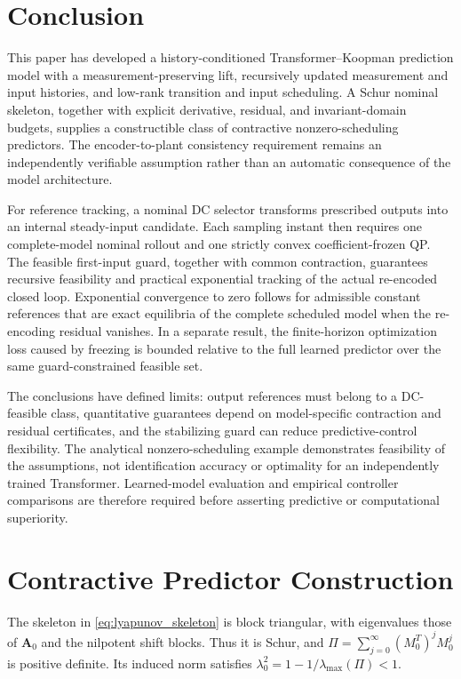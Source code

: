 \documentclass[journal]{IEEEtran}
\theoremstyle{plain}
\theoremstyle{definition}
\newcommand{\mA}{\mathbf{A}}
\begin{document}
\section{Conclusion}
\label{sec:conclusion}
{\color{blue}This paper has developed a history-conditioned Transformer--Koopman prediction model with a measurement-preserving lift, recursively updated measurement and input histories, and low-rank transition and input scheduling. A Schur nominal skeleton, together with explicit derivative, residual, and invariant-domain budgets, supplies a constructible class of contractive nonzero-scheduling predictors. The encoder-to-plant consistency requirement remains an independently verifiable assumption rather than an automatic consequence of the model architecture.

For reference tracking, a nominal DC selector transforms prescribed outputs into an internal steady-input candidate. Each sampling instant then requires one complete-model nominal rollout and one strictly convex coefficient-frozen QP. The feasible first-input guard, together with common contraction, guarantees recursive feasibility and practical exponential tracking of the actual re-encoded closed loop. Exponential convergence to zero follows for admissible constant references that are exact equilibria of the complete scheduled model when the re-encoding residual vanishes. In a separate result, the finite-horizon optimization loss caused by freezing is bounded relative to the full learned predictor over the same guard-constrained feasible set.

The conclusions have defined limits: output references must belong to a DC-feasible class, quantitative guarantees depend on model-specific contraction and residual certificates, and the stabilizing guard can reduce predictive-control flexibility. The analytical nonzero-scheduling example demonstrates feasibility of the assumptions, not identification accuracy or optimality for an independently trained Transformer. Learned-model evaluation and empirical controller comparisons are therefore required before asserting predictive or computational superiority.}

\appendices
\section{Contractive Predictor Construction}
\label{app:construction}
The skeleton in \eqref{eq:lyapunov_skeleton} is block triangular, with eigenvalues those of $\mA_0$ and the nilpotent shift blocks. Thus it is Schur, and $\Pi=\sum_{j=0}^{\infty}(M_0^T)^jM_0^j$ is positive definite. Its induced norm satisfies $\lambda_0^2=1-1/\lambda_{\max}(\Pi)<1$.
\end{document}
